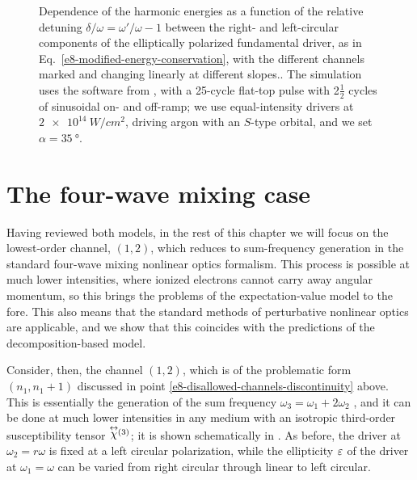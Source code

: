 \begin{figure}[t]
  \centering
  \hspace{0mm}
  
  \captionsetup{width=\textwidth}
  \caption[
  Harmonic spectra for detuned bicircular drivers as a function of the relative detuning $\delta=\omega'/\omega-1$ between the right- and left-circular components of the elliptically polarized fundamental driver
  ]{
  Dependence of the harmonic energies as a function of the relative detuning $\delta/\omega = \omega'/ \omega-1$ between the right- and left-circular components of the elliptically polarized fundamental driver, as in Eq.~\eqref{e8-modified-energy-conservation}, with the different channels marked and changing linearly at different slopes..
  The simulation uses the software from , with a 25-cycle flat-top pulse with 2$\tfrac 12$ cycles of sinusoidal on- and off-ramp; we use equal-intensity drivers at $\SI{2e14}{W/cm^2}$, driving argon with an $S$-type orbital, and we set $\alpha=\SI{35}{\degree}$.
  }
  \label{f8-SFA-splittings-spectrum}
\end{figure}









\section{The four-wave mixing case}
\label{sec:four-wave-mixing}

Having reviewed both models, in the rest of this chapter we will focus on the lowest-order channel, $(1,2)$, which reduces to sum-frequency generation in the standard four-wave mixing nonlinear optics formalism. This process is possible at much lower intensities, where ionized electrons cannot carry away angular momentum, so this brings the problems of the expectation-value model to the fore. This also means that the standard methods of perturbative nonlinear optics are applicable, and we show that this coincides with the predictions of the decomposition-based model.

Consider, then, the channel $(1,2)$, which is of the problematic form $(n_1,n_1+1)$ discussed in point \ref{e8-disallowed-channels-discontinuity} above. This is essentially the generation of the sum frequency $\omega_3=\omega_1+2\omega_2$ \cite{BloembergenSecondHarmonic}, and it can be done at much lower intensities in any medium with an isotropic third-order susceptibility tensor $\stackrel{\leftrightarrow}{\chi}\!\!{}^{(3)}$; it is shown schematically in . As before, the driver at $\omega_2=r\omega$ is fixed at a left circular polarization, while the ellipticity $\varepsilon$ of the driver at $\omega_1=\omega$ can be varied from right circular through linear to left circular.




